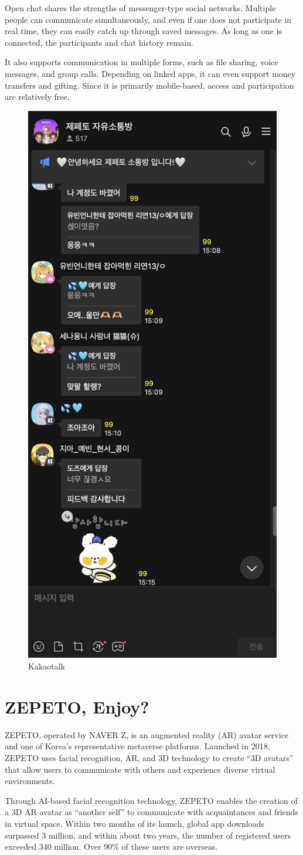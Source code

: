 Open chat shares the strengths of messenger-type social networks. Multiple people can communicate simultaneously, and even if one does not participate in real time, they can easily catch up through saved messages. As long as one is connected, the participants and chat history remain.  

It also supports communication in multiple forms, such as file sharing, voice messages, and group calls. Depending on linked apps, it can even support money transfers and gifting. Since it is primarily mobile-based, access and participation are relatively free.  

\begin{figure}[tbph!]
	\centering
	\includegraphics[width=0.3\linewidth]{template/images/chap4/kakaotalk.png}
	\caption[Kakaotalk]{Kakaotalk}
	\label{fig:image}
\end{figure}

\section{ZEPETO, Enjoy?}
ZEPETO, operated by NAVER Z, is an augmented reality (AR) avatar service and one of Korea’s representative metaverse platforms. Launched in 2018, ZEPETO uses facial recognition, AR, and 3D technology to create “3D avatars” that allow users to communicate with others and experience diverse virtual environments.  

Through AI-based facial recognition technology, ZEPETO enables the creation of a 3D AR avatar as “another self” to communicate with acquaintances and friends in virtual space. Within two months of its launch, global app downloads surpassed 3 million, and within about two years, the number of registered users exceeded 340 million. Over 90\% of these users are overseas.  

